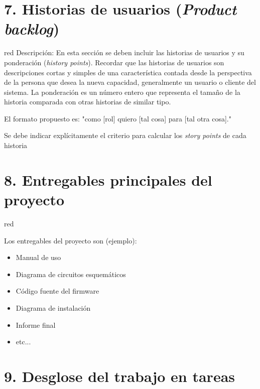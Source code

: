 \documentclass[
11pt, %
codirector, %
]{charter}
\begin{document}
\section{7. Historias de usuarios (\textit{Product backlog})}
\label{sec:backlog}

\begin{consigna}{red}
Descripción: En esta sección se deben incluir las historias de usuarios y su ponderación (\textit{history points}). Recordar que las historias de usuarios son descripciones cortas y simples de una característica contada desde la perspectiva de la persona que desea la nueva capacidad, generalmente un usuario o cliente del sistema. La ponderación es un número entero que representa el tamaño de la historia comparada con otras historias de similar tipo.

El formato propuesto es: "como [rol] quiero [tal cosa] para [tal otra cosa]."

Se debe indicar explícitamente el criterio para calcular los \textit{story points} de cada historia
\end{consigna}

\section{8. Entregables principales del proyecto}
\label{sec:entregables}

\begin{consigna}{red}

Los entregables del proyecto son (ejemplo):

\begin{itemize}
	\item Manual de uso
	\item Diagrama de circuitos esquemáticos
	\item Código fuente del firmware
	\item Diagrama de instalación
	\item Informe final
	\item etc...
\end{itemize}

\end{consigna}

\section{9. Desglose del trabajo en tareas}
\label{sec:wbs}
\end{document}
